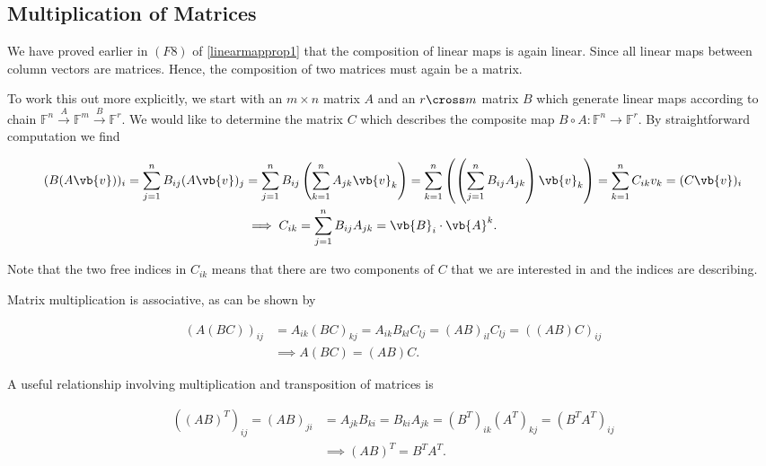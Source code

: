 \documentclass[a4paper,12pt]{report}
\begin{document}
\subsection{Multiplication of Matrices}

We have proved earlier in \((F8)\)  of \cref{linearmapprop1} that the composition of linear maps is again linear. Since all linear maps between column vectors are matrices. Hence, the composition of two matrices must again be a matrix. 

To work this out more explicitly, we start with an \(m \times n\) matrix \(A\) and an \(r \cross m\) matrix \(B\) which generate linear maps according to chain \(\mathbb{F}^{n} \stackrel{A}{\rightarrow } \mathbb{F}^{m} \stackrel{B}{\rightarrow } \mathbb{F}^{r}   \). We would like to determine the matrix \(C\) which describes the composite map \(B \circ A: \mathbb{F}^{n} \rightarrow \mathbb{F}^{r}  \). By straightforward computation we find

\begin{equation}
    \begin{aligned}
    (B(A\vb{v} ))_{i} = \sum_{j=1}^{n} B_{ij} (A\vb{v} )_{j} &= \sum_{j=1}^{n} B_{ij} \left( \sum_{k=1}^{n} A_{jk}\vb{v} _{k}\right) = \sum_{k=1}^{n} \left( \left(\sum_{j=1}^{n} B_{ij} A_{jk}  \right) \vb{v} _{k} \right)= \sum_{k=1}^{n} C_{ik} v_{k} = (C\vb{v} )_{i} \\
    &\implies C_{ik} = \sum_{j=1}^{n} B_{ij} A_{jk} = \vb{B} _{i} \cdot \vb{A} ^{k}.   
    \end{aligned}
\end{equation}

Note that the two free indices in \(C_{ik} \) means that there are two components of \(C\) that we are interested in and the indices are describing. 

Matrix multiplication is associative, as can be shown by 

\begin{equation}
    \begin{aligned}
    (A(BC))_{ij} &= A_{ik}(BC)_{kj} = A_{ik}B_{kl}C_{lj} = (AB)_{il}C_{lj} = ((AB)C)_{ij} \\
    &\implies A(BC) = (AB)C.
    \end{aligned}
\end{equation}

A useful relationship involving multiplication and transposition of matrices is 

\begin{equation}
    \begin{aligned}
    ((AB)^{T} )_{ij} = (AB)_{ji} &= A _{jk}B_{ki} = B_{ki}A_{jk} = (B^{T} )_{ik} (A^{T} )_{kj} = (B^{T}A^{T}  )_{ij} \\
    &\implies (AB)^{T} = B^{T} A^{T}.   
    \end{aligned}     
\end{equation}
\end{document}
